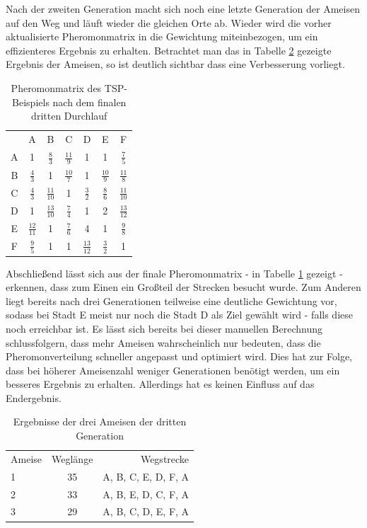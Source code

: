 	Nach der zweiten Generation macht sich noch eine letzte Generation der Ameisen auf den Weg und läuft wieder die gleichen Orte ab. Wieder wird die vorher aktualisierte Pheromonmatrix in die Gewichtung miteinbezogen, um ein effizienteres Ergebnis zu erhalten. Betrachtet man das in Tabelle \ref{tspAcoNumerisch_ergebnis_3} gezeigte Ergebnis der Ameisen, so ist deutlich sichtbar dass eine Verbesserung vorliegt.
	\begin{table}[h]
		\centering
		\footnotesize
		\begin{tabular}{c c c c c c c}
			& A & B & C & D & E & F \\
			A & 1 & $\frac{8}{3}$ & $\frac{11}{9}$ & 1 & 1 & $\frac{7}{5}$\\ 
			B & $\frac{4}{3}$ & 1 & $\frac{10}{7}$ & 1 & $\frac{10}{9}$ & $\frac{11}{8}$\\ 
			C & $\frac{4}{3}$ & $\frac{11}{10}$ & 1 & $\frac{3}{2}$ & $\frac{8}{6}$ & $\frac{11}{10}$\\
			D & 1 & $\frac{13}{10}$ & $\frac{7}{4}$ & 1 & 2 & $\frac{13}{12}$\\
			E & $\frac{12}{11}$ & 1 & $\frac{7}{6}$ & 4 & 1 & $\frac{9}{8}$\\
			F & $\frac{9}{5}$ & 1 & 1 & $\frac{13}{12}$ & $\frac{3}{2}$ & 1\\
		\end{tabular}
		\caption{Pheromonmatrix des \ac{TSP}-Beispiels nach dem finalen dritten Durchlauf}
		\label{tspAcoNumerisch_pheromon_3}
	\end{table}
	Abschließend lässt sich aus der finale Pheromonmatrix - in Tabelle \ref{tspAcoNumerisch_pheromon_3} gezeigt - erkennen, dass zum Einen ein Großteil der Strecken besucht wurde. Zum Anderen liegt bereits nach drei Generationen teilweise eine deutliche Gewichtung vor, sodass bei Stadt E meist nur noch die Stadt D als Ziel gewählt wird - falls diese noch erreichbar ist.
	Es lässt sich bereits bei dieser manuellen Berechnung schlussfolgern, dass mehr Ameisen wahrscheinlich nur bedeuten, dass die Pheromonverteilung schneller angepasst und optimiert wird. Dies hat zur Folge, dass bei höherer Ameisenzahl weniger Generationen benötigt werden, um ein besseres Ergebnis zu erhalten. Allerdings hat es keinen Einfluss auf das Endergebnis.
	\begin{table}[h]
		\centering
		\footnotesize
		\begin{tabular}{l c r}
			Ameise & Weglänge & Wegstrecke \\
			1 & 35 & A, B, C, E, D, F, A\\
			2 & 33 & A, B, E, D, C, F, A\\ 
			3 & 29 & A, B, C, D, E, F, A\\
		\end{tabular}
		\caption{Ergebnisse der drei Ameisen der dritten Generation}
		\label{tspAcoNumerisch_ergebnis_3}
	\end{table}